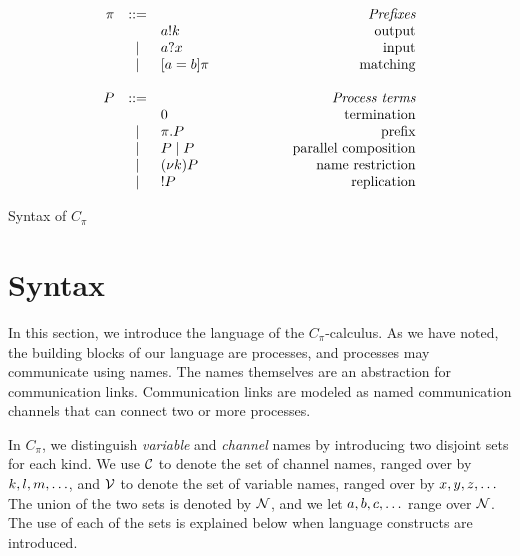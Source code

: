 %
\begin{table}[t]
\[
\displaystyle
\begin{array}[t]{rcl@{\qquad\qquad\qquad}r}
 \pi & ::= & 								 &   \emph{Prefixes}\\
     &        & \send\NA\role\msg\NK    	 &   \text{output}\\
     & \parop & \receive\NA\role\msg{x} 	 &   \text{input}\\
     & \parop & \match\NA\role\msg\NB\pi     &   \text{matching}\\
     &        &								 &   \\
  \PP & ::= & 								 &	 \emph{Process terms}\\
     &        & \inact 						 &   \text{termination}\\
     & \parop & \pi.\PP  					 &   \text{prefix}\\
     & \parop & \PP\parop\PP 				 &   \text{parallel composition}\\
     & \parop & \rest\NK \PP  				 &   \text{name restriction}\\
     & \parop & \rep\PP 					 &   \text{replication}\\
\end{array}
\]
\caption{\label{tab:Cpi_syntax} Syntax of $C_\pi$}
\end{table}
%




\section{Syntax}\label{sec:Cpi-syntax} 

In this section, we introduce the language of the $C_\pi$-calculus. 
As we have noted, the building blocks of our language are processes, 
and processes may communicate using names. 
The names themselves are an abstraction for communication links. Communication links are modeled as named communication channels that can connect two or more processes. 

In $C_\pi$, we distinguish \emph{variable} and \emph{channel} names by introducing two disjoint sets for each kind. 
We use ${\cal C}$ to denote the set of channel names, ranged over by $k, l, m, \ldots$, and ${\cal V}$ to 
denote the set of variable names, ranged over by $x, y, z, \ldots$ 
The union of the two sets is denoted by ${\cal N}$, and we let $a, b, c, \ldots$ range over ${\cal N}$. 
The use of each of the sets is explained below when language constructs are introduced.


